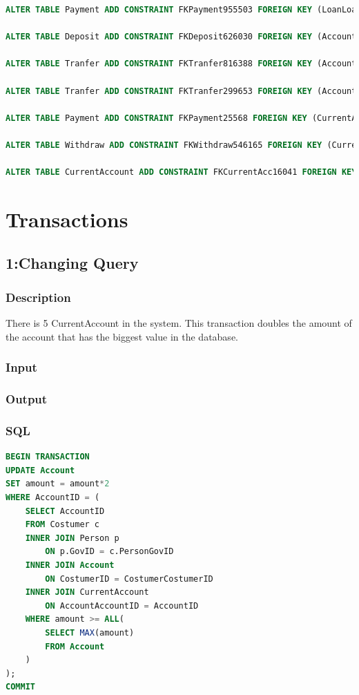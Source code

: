 \documentclass[a4paper, 10pt]{article}
\begin{document}
\begin{lstlisting}[language=SQL]
ALTER TABLE Payment ADD CONSTRAINT FKPayment955503 FOREIGN KEY (LoanLoanID) REFERENCES Loan (LoanID);

ALTER TABLE Deposit ADD CONSTRAINT FKDeposit626030 FOREIGN KEY (AccountAccountID) REFERENCES Account (AccountID);

ALTER TABLE Tranfer ADD CONSTRAINT FKTranfer816388 FOREIGN KEY (AccountAccountID) REFERENCES Account (AccountID);

ALTER TABLE Tranfer ADD CONSTRAINT FKTranfer299653 FOREIGN KEY (AccountAccountID2) REFERENCES Account (AccountID);

ALTER TABLE Payment ADD CONSTRAINT FKPayment25568 FOREIGN KEY (CurrentAccountAccountID) REFERENCES CurrentAccount (AccountAccountID);

ALTER TABLE Withdraw ADD CONSTRAINT FKWithdraw546165 FOREIGN KEY (CurrentAccountAccountID) REFERENCES CurrentAccount (AccountAccountID);

ALTER TABLE CurrentAccount ADD CONSTRAINT FKCurrentAcc16041 FOREIGN KEY (AccountAccountID) REFERENCES Account (AccountID);
\end{lstlisting}

\section{Transactions}

\subsection{1:Changing Query}
\subsubsection{Description}
There is 5 CurrentAccount in the system. This transaction doubles the amount of the account that has the biggest value in the database.

\subsubsection{Input}
\subsubsection{Output}

\subsubsection{SQL}
\begin{lstlisting}[language=SQL]
BEGIN TRANSACTION
UPDATE Account 
SET amount = amount*2 
WHERE AccountID = (
    SELECT AccountID 
    FROM Costumer c 
    INNER JOIN Person p 
        ON p.GovID = c.PersonGovID 
    INNER JOIN Account 
        ON CostumerID = CostumerCostumerID 
    INNER JOIN CurrentAccount 
        ON AccountAccountID = AccountID 
    WHERE amount >= ALL(
        SELECT MAX(amount) 
        FROM Account 
    )
);
COMMIT
\end{lstlisting}
\end{document}
